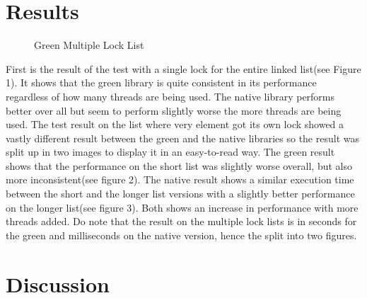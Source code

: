 \documentclass{article}
\begin{document}
\section{Results}\label{results}


\begin{figure}
\hspace{4em}
\caption{Green Multiple Lock List}
\label{fig:gl}
\end{figure}

First is the result of the test with a single lock for the entire linked list(see Figure 1). It shows that the green library is quite consistent in its performance regardless of how many threads are being used. The native library performs better over all but seem to perform slightly worse the more threads are being used. 
The test result on the list where very element got its own lock showed a vastly different result between the green and the native libraries so the result was split up in two images to display it in an easy-to-read way. The green result shows that the performance on the short list was slightly worse overall, but also more inconsistent(see figure 2). The native result shows a similar execution time between the short and the longer list versions with a slightly better performance on the longer list(see figure 3). Both shows an increase in performance with more threads added. Do note that the result on the multiple lock lists is in seconds for the green and milliseconds on the native version, hence the split into two figures.



\section{Discussion}\label{discussion}
\end{document}
